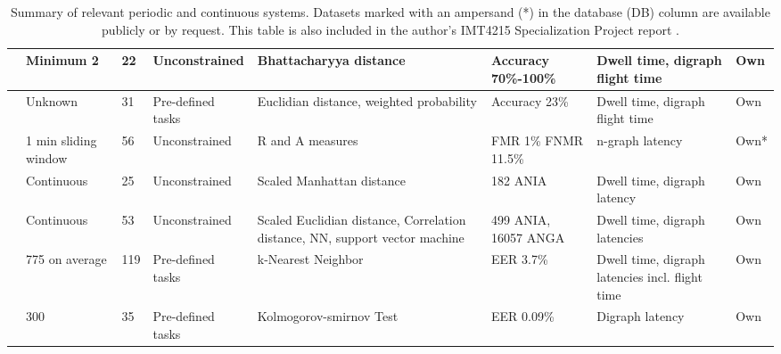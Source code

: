 \documentclass[informationsecurity]{gucmasterproject}
\begin{document}
\begin{table}[h]
{\begin{tabular}{ |l|p{2.1cm}|l|p{2.15cm}|p{3cm}|p{2.3cm}|p{2.5cm}|l| }
 \cite{Janakiraman2007} & Minimum 2 & 22 & Unconstrained & Bhattacharyya distance & Accuracy 70\%-100\% & Dwell time, digraph flight time & Own\\ \hline
 \cite{Monrose} & Unknown & 31 & Pre-defined tasks & Euclidian distance, weighted probability & Accuracy 23\% & Dwell time, digraph flight time & Own\\ \hline
 \cite{sliding} & 1 min sliding window & 56 & Unconstrained & R and A measures & FMR 1\% FNMR 11.5\% & n-graph latency & Own*\\ \hline
 \cite{BOURS201236} & Continuous & 25 & Unconstrained & Scaled Manhattan distance & 182 ANIA & Dwell time, digraph latency & Own\\ \hline
 \cite{mondal} & Continuous & 53 & Unconstrained & Scaled Euclidian distance, Correlation distance, NN, support vector machine & 499 ANIA, 16057 ANGA & Dwell time, digraph latencies & Own \\ \hline
 \cite{monaco} & 775 on average & 119 & Pre-defined tasks & k-Nearest Neighbor & EER 3.7\% & Dwell time, digraph latencies incl. flight time & Own \\ \hline
 \cite{park} & 300 & 35 & Pre-defined tasks & Kolmogorov-smirnov Test & EER 0.09\% & Digraph latency & Own \\ \hline

\end{tabular}
}
\caption{Summary of relevant periodic and continuous systems. Datasets marked with an ampersand (*) in the database (DB) column are available publicly or by request. This table is also included in the author's IMT4215 Specialization Project report \cite{nilsenSpec}.}
\label{tab:summary}
\end{table}



\end{document}
